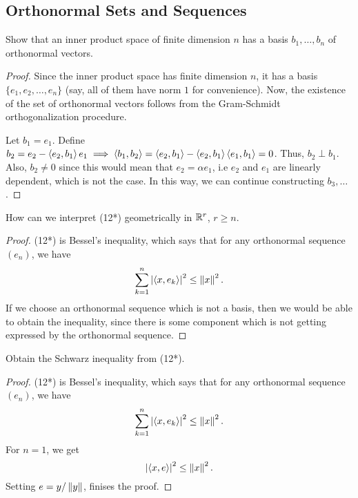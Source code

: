\subsection{Orthonormal Sets and Sequences}

\begin{question}
    Show that an inner product space of finite dimension $n$ has a basis $b_1 , \ldots , b_n$ of orthonormal vectors.
    \label{section3.4-1}
\end{question}
\begin{proof}
    Since the inner product space has finite dimension $n$, it has a basis $\{e_1 , e_2 , \ldots , e_n\}$ (say, all of them have norm $1$ for convenience). Now, the existence of the set of orthonormal vectors follows from the Gram-Schmidt orthogonalization procedure.

    Let $b_1 = e_1$. Define $b_2 = e_2 - \left\langle e_2 , b_1 \right\rangle e_1 \implies \left\langle b_1 , b_2 \right\rangle = \left\langle e_2 , b_1 \right\rangle - \left\langle e_2 , b_1 \right\rangle \left\langle e_1 , b_1 \right\rangle = 0$. Thus, $b_2 \perp b_1$. Also, $b_2 \neq 0$ since this would mean that $e_2 = \alpha e_1$, i.e $e_2$ and $e_1$ are linearly dependent, which is not the case. In this way, we can continue constructing $b_3 , \ldots$.
    
\end{proof}

\begin{question}
    How can we interpret (12*) geometrically in $\mathbb{R}^r$, $r \geq n$.
    \label{section3.4-2}
\end{question}
\begin{proof}
    (12*) is Bessel's inequality, which says that for any orthonormal sequence $(e_n)$, we have
    \[\sum_{k=1}^n \left\lvert \left\langle x , e_k \right\rangle \right\rvert^2 \leq \left\lVert x \right\rVert^2.\]
    If we choose an orthonormal sequence which is not a basis, then we would be able to obtain the inequality, since there is some component which is not getting expressed by the orthonormal sequence.
\end{proof}

\begin{question}
    Obtain the Schwarz inequality from (12*).
    \label{section3.4-3}
\end{question}
\begin{proof}
    (12*) is Bessel's inequality, which says that for any orthonormal sequence $(e_n)$, we have
    \[\sum_{k=1}^n \left\lvert \left\langle x , e_k \right\rangle \right\rvert^2 \leq \left\lVert x \right\rVert^2.\]
    For $n = 1$, we get
    \[\left\lvert \left\langle x , e \right\rangle \right\rvert^2 \leq \left\lVert x \right\rVert^2.\]
    Setting $e = y/\left\lVert y \right\rVert$, finises the proof.
\end{proof}

